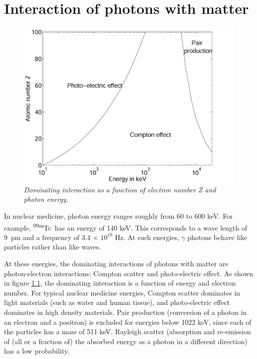 \chapter{Interaction of photons with matter}

\begin{figure}[tb]
\centering
\includegraphics[width = \figone]{figs/fig_foto_compton_pair.pdf}
\caption{\label{fig:foto_compton_pair} \emph{Dominating interaction as a
function of electron number Z and photon energy.}}
\end{figure}

In nuclear medicine, photon energy ranges roughly from 60 to 600 keV. For
example, \textsuperscript{99m}Tc\ has an energy of 140 keV. This corresponds to a wave
length of 9~pm and a frequency of 3.4 $\times$ $10^{19}$ Hz. At such energies,
$\gamma$ photons behave like particles rather than like waves.

At these energies, the dominating interactions of photons with matter are
photon-electron interactions: Compton scatter and photo-electric effect. As
shown in figure \ref{fig:foto_compton_pair}, the dominating interaction is a
function of energy and electron number. For typical nuclear medicine
energies, Compton scatter dominates in light materials (such as water and
human tissue), and photo-electric effect dominates in high density materials.
Pair production (conversion of a photon in an electron and a positron) is
excluded for energies below 1022 keV, since each of the particles has a mass
of 511 keV. Rayleigh scatter (absorption and re-emission of (all or a
fraction of) the absorbed energy as a photon in a different direction) has a
low probability.

